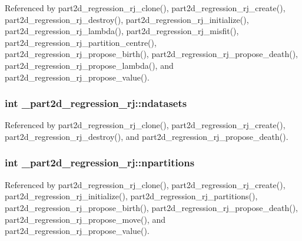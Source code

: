 Referenced by part2d\+\_\+regression\+\_\+rj\+\_\+clone(), part2d\+\_\+regression\+\_\+rj\+\_\+create(), part2d\+\_\+regression\+\_\+rj\+\_\+destroy(), part2d\+\_\+regression\+\_\+rj\+\_\+initialize(), part2d\+\_\+regression\+\_\+rj\+\_\+lambda(), part2d\+\_\+regression\+\_\+rj\+\_\+misfit(), part2d\+\_\+regression\+\_\+rj\+\_\+partition\+\_\+centre(), part2d\+\_\+regression\+\_\+rj\+\_\+propose\+\_\+birth(), part2d\+\_\+regression\+\_\+rj\+\_\+propose\+\_\+death(), part2d\+\_\+regression\+\_\+rj\+\_\+propose\+\_\+lambda(), and part2d\+\_\+regression\+\_\+rj\+\_\+propose\+\_\+value().

\subsubsection[{\texorpdfstring{ndatasets}{ndatasets}}]{\setlength{\rightskip}{0pt plus 5cm}int \+\_\+part2d\+\_\+regression\+\_\+rj\+::ndatasets}\hypertarget{struct__part2d__regression__rj_ad7c988b66b5acff1cdaf0da01bd0b3cf}{}\label{struct__part2d__regression__rj_ad7c988b66b5acff1cdaf0da01bd0b3cf}


Referenced by part2d\+\_\+regression\+\_\+rj\+\_\+clone(), part2d\+\_\+regression\+\_\+rj\+\_\+create(), part2d\+\_\+regression\+\_\+rj\+\_\+destroy(), and part2d\+\_\+regression\+\_\+rj\+\_\+propose\+\_\+death().

\subsubsection[{\texorpdfstring{npartitions}{npartitions}}]{\setlength{\rightskip}{0pt plus 5cm}int \+\_\+part2d\+\_\+regression\+\_\+rj\+::npartitions}\hypertarget{struct__part2d__regression__rj_a5f095d104acedc2961df8eacd07d2668}{}\label{struct__part2d__regression__rj_a5f095d104acedc2961df8eacd07d2668}


Referenced by part2d\+\_\+regression\+\_\+rj\+\_\+clone(), part2d\+\_\+regression\+\_\+rj\+\_\+create(), part2d\+\_\+regression\+\_\+rj\+\_\+initialize(), part2d\+\_\+regression\+\_\+rj\+\_\+partitions(), part2d\+\_\+regression\+\_\+rj\+\_\+propose\+\_\+birth(), part2d\+\_\+regression\+\_\+rj\+\_\+propose\+\_\+death(), part2d\+\_\+regression\+\_\+rj\+\_\+propose\+\_\+move(), and part2d\+\_\+regression\+\_\+rj\+\_\+propose\+\_\+value().

